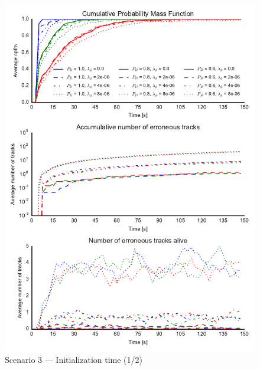 \begin{figure}
\centering
\includegraphics{Figures/plots/Scenario3_Init-Time(1-2).pdf}
\caption{Scenario 3 --- Initialization time (1/2)}\label{fig:init3_time_1-2}
\end{figure}

